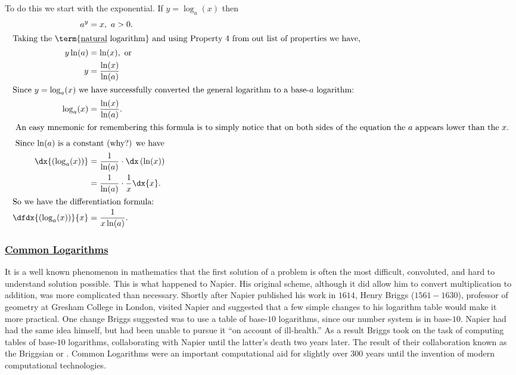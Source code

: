 To do this we start with the exponential. If $y=\log_a(x)$ then
\begin{align*}
  a^y&=x,\  a>0.\\
  \intertext{Taking the \term{\underline{natural} logarithm} and using
  Property 4 from out list of properties  we have,}
  y\ln(a)&=\ln(x), \text{ or}\\
  y&=\frac{\ln(x)}{\ln(a)}\\
  \intertext{Since $y=\log_a(x)$ we have successfully converted the general
  logarithm to a base-$a$ logarithm:}
  \log_a(x)&=\frac{\ln(x)}{\ln(a)}.\\
\intertext{
An easy mnemonic for remembering this formula is to simply notice that
  on both sides of the equation the $a$ appears lower than the $x$.}
  \intertext{
 Since $\ln(a)$ is a
 constant (why?) we have}
  \dx{(\log_a(x))}&=\frac{1}{\ln(a)}\cdot\dx\left(\ln(x)\right)\\
     &=\frac{1}{\ln(a)}\cdot\frac1x\dx{x}.\\
  \intertext{So we have the differentiation formula:}
  \dfdx{(\log_a(x))}{x}&=\frac{1}{x\ln(a)}.
\end{align*}

\subsubsection*{\underline{Common Logarithms}}
It is a well known phenomenon in mathematics that the first solution
of a problem is often the most difficult, convoluted, and hard to
understand solution possible. This is what happened to Napier. His
original scheme, although it did allow him to convert multiplication
to addition, was more complicated than necessary.  Shortly after
Napier published his work in $1614$, Henry Briggs ($1561 - 1630$),
professor of geometry at Gresham College in London, visited Napier and
suggested that a few simple changes to his logarithm table would make
it more practical. One change Briggs suggested was to use a table of
base-$10$ logarithms, since our number system is in base-$10$. Napier
had had the same idea himself, but had been unable to pursue it ``on
account of ill-health.'' As a result Briggs took on the task of
computing tables of base-$10$ logarithms, collaborating with Napier
until the latter's death two years later. The result of their
collaboration known as the Briggsian or . Common Logarithms were an important computational aid for
slightly over $300$ years until the invention of modern computational
technologies. 

